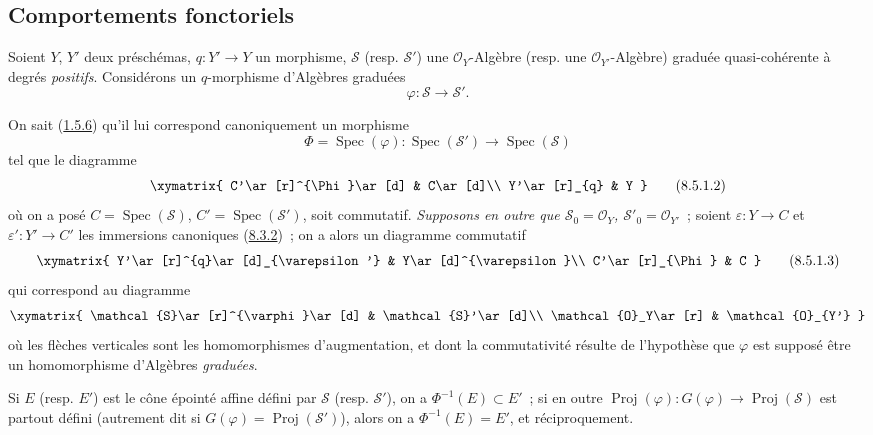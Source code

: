 \subsection{Comportements fonctoriels}
\label{subsection:II.8.5-fr}

\begin{env}[8.5.1]
\label{II.8.5.1-fr}
Soient $Y$, $Y'$ deux préschémas, $q:Y'\to Y$ un morphisme,
$\mathcal{S}$ (resp. $\mathcal{S}'$) une $\mathcal{O}_Y$-Algèbre
(resp. une $\mathcal{O}_{Y'}$-Algèbre) graduée quasi-cohérente à degrés
\emph{positifs}. Considérons un $q$-morphisme d'Algèbres graduées
\begin{equation}
\label{II.8.5.1.1-fr}
  \varphi:\mathcal{S}\to\mathcal{S}'.
\tag{8.5.1.1}
\end{equation}

On sait (\hyperref[II.1.5.6-fr]{1.5.6}) qu'il lui correspond canoniquement un
morphisme
\[
  \Phi=\operatorname{Spec}(\varphi):
  \operatorname{Spec}(\mathcal{S}')\to\operatorname{Spec}(\mathcal{S})
\]
tel que le diagramme
\begin{equation}
\label{II.8.5.1.2-fr}
  \xymatrix{
    C'\ar[r]^{\Phi}\ar[d] & C\ar[d]\\
    Y'\ar[r]_{q} & Y
  }
\tag{8.5.1.2}
\end{equation}
où on a posé $C=\operatorname{Spec}(\mathcal{S})$,
$C'=\operatorname{Spec}(\mathcal{S}')$, soit commutatif. 
\emph{Supposons en outre que
$\mathcal{S}_0=\mathcal{O}_Y$, $\mathcal{S}'_0=\mathcal{O}_{Y'}$}~; soient
$\varepsilon:Y\to C$ et $\varepsilon':Y'\to C'$ les immersions canoniques
(\hyperref[II.8.3.2-fr]{8.3.2})~; on a alors un diagramme commutatif
\begin{equation}
\label{II.8.5.1.3-fr}
  \xymatrix{
    Y'\ar[r]^{q}\ar[d]_{\varepsilon'} & Y\ar[d]^{\varepsilon}\\
    C'\ar[r]_{\Phi} & C
  }
\tag{8.5.1.3}
\end{equation}
qui correspond au diagramme
\[
  \xymatrix{
    \mathcal{S}\ar[r]^{\varphi}\ar[d] & \mathcal{S}'\ar[d]\\
    \mathcal{O}_Y\ar[r] & \mathcal{O}_{Y'}
  }
\]
où les flèches verticales sont les homomorphismes d'augmentation, et dont la
commutativité résulte de l'hypothèse que $\varphi$ est supposé être un
homomorphisme d'Algèbres \emph{graduées}.
\end{env}

\begin{proposition}[8.5.2]
\label{II.8.5.2-fr}
Si $E$ \textup{(resp. $E'$)} est le cône épointé affine défini par $\mathcal{S}$
\textup{(resp. $\mathcal{S}'$)}, on a $\Phi^{-1}(E)\subset E'$~; si en outre
$\operatorname{Proj}(\varphi):G(\varphi)\to\operatorname{Proj}(\mathcal{S})$
est partout défini (autrement dit si
$G(\varphi)=\operatorname{Proj}(\mathcal{S}')$), alors on a
$\Phi^{-1}(E)=E'$, et réciproquement.
\end{proposition}

